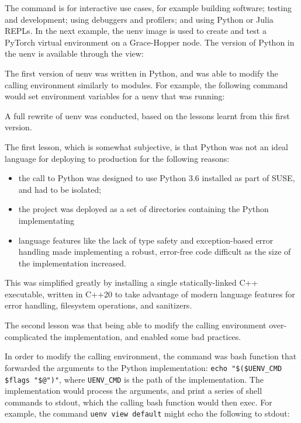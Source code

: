 The  command is for interactive use cases, for example building software; testing and development; using debuggers and profilers; and using Python or Julia REPLs.
In the next example, the  uenv image is used to create and test a PyTorch virtual environment on a Grace-Hopper node.
The version of Python in the uenv is available through the  view:



The first version of uenv was written in Python, and was able to modify the calling environment similarly to modules.
For example, the following command would set environment variables for a uenv that was running:


A full rewrite of uenv was conducted, based on the lessons learnt from this first version.

The first lesson, which is somewhat subjective, is that Python was not an ideal language for deploying to production for the following reasons:
\begin{itemize}
    \item the call to Python was designed to use Python 3.6 installed as part of SUSE, and had to be isolated;
    \item the project was deployed as a set of directories containing the Python implementating
    \item language features like the lack of type safety and exception-based error handling made implementing a robust, error-free code difficult as the size of the implementation increased.
\end{itemize}

This was simplified greatly by installing a single statically-linked C++ executable, written in C++20 to take advantage of modern language features for error handling, filesystem operations, and sanitizers.

The second lesson was that being able to modify the calling environment over-complicated the implementation, and enabled some bad practices.

In order to modify the calling environment, the  command was bash function that forwarded the arguments to the Python implementation: \lstinline{echo "$($UENV_CMD $flags "$@")"}, where \lstinline{UENV_CMD} is the path of the implementation.
The implementation would process the arguments, and print a series of shell commands to stdout, which the calling bash function would then exec.
For example, the command \lstinline{uenv view default} might echo the following to stdout:


